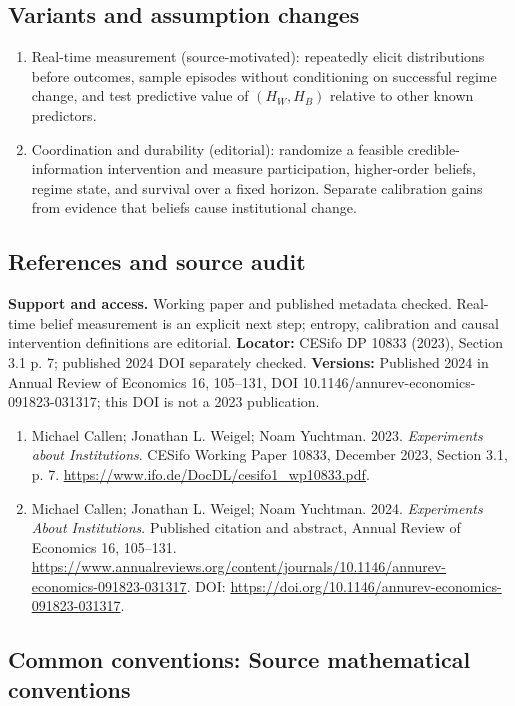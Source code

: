 \documentclass[11pt,a4paper]{article}
\begin{document}
\subsection*{Variants and assumption changes}
\begin{enumerate}
\item Real-time measurement (source-motivated): repeatedly elicit distributions before outcomes, sample episodes without conditioning on successful regime change, and test predictive value of \((H_W,H_B)\) relative to other known predictors.
\item Coordination and durability (editorial): randomize a feasible credible-information intervention and measure participation, higher-order beliefs, regime state, and survival over a fixed horizon. Separate calibration gains from evidence that beliefs cause institutional change.
\end{enumerate}
\subsection*{References and source audit}
\textbf{Support and access.} Working paper and published metadata checked. Real-time belief measurement is an explicit next step; entropy, calibration and causal intervention definitions are editorial. \textbf{Locator:} CESifo DP 10833 (2023), Section 3.1 p. 7; published 2024 DOI separately checked. \textbf{Versions:} Published 2024 in Annual Review of Economics 16, 105--131, DOI 10.1146/annurev-economics-091823-031317; this DOI is not a 2023 publication. 
\begin{enumerate}\raggedright
\item\hypertarget{definitions:source:30007662:1}{} Michael Callen; Jonathan L. Weigel; Noam Yuchtman. 2023. \emph{Experiments about Institutions}. CESifo Working Paper 10833, December 2023, Section 3.1, p. 7.
\url{https://www.ifo.de/DocDL/cesifo1_wp10833.pdf}.
\item\hypertarget{definitions:source:30007662:2}{} Michael Callen; Jonathan L. Weigel; Noam Yuchtman. 2024. \emph{Experiments About Institutions}. Published citation and abstract, Annual Review of Economics 16, 105--131.
\url{https://www.annualreviews.org/content/journals/10.1146/annurev-economics-091823-031317}.
DOI: \url{https://doi.org/10.1146/annurev-economics-091823-031317}.
\end{enumerate}

\subsection*{Common conventions: Source mathematical conventions}
\end{document}
